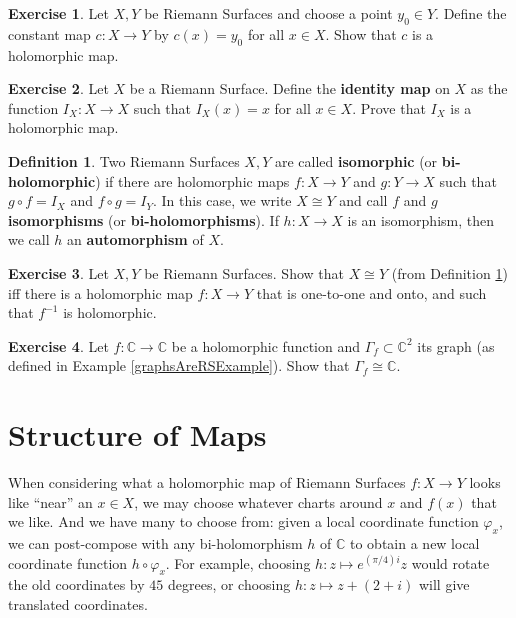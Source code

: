 \documentclass[12pt]{book}%
\theoremstyle{plain}
\theoremstyle{definition}
\newtheorem{definition}[theorem]{Definition}
\newtheorem{exercise}{Exercise}
\theoremstyle{remark}
\def\to{\rightarrow}
\def\bC{{\mathbb{C}}}
\begin{document}
\begin{exercise}
Let $X,Y$ be Riemann Surfaces and choose a point $y_0\in Y$. Define the constant map $c:X \to Y$ by $c(x) = y_0$ for all $x \in X$. Show that $c$ is a holomorphic map.
\end{exercise}


\begin{exercise}
Let $X$ be a Riemann Surface. Define the \textbf{identity map} on $X$ as the function $I_X:X \to X$ such that $I_X(x)=x$ for all $x\in X$. Prove that $I_X$ is a holomorphic map.
\end{exercise}


\begin{definition}
\label{isomorphicRS}
Two Riemann Surfaces $X,Y$ are called \textbf{isomorphic} (or \textbf{bi-holomorphic}) if there are holomorphic maps $f:X \to Y$ and $g:Y \to X$ such that $g \circ f = I_X$ and $f \circ g = I_Y$. In this case, we write $X \cong Y$ and call $f$ and $g$ \textbf{isomorphisms} (or\textbf{ bi-holomorphisms}). If $h:X \to X$ is an isomorphism, then we call $h$ an \textbf{automorphism} of $X$.
\end{definition}

\begin{exercise}
Let $X,Y$ be Riemann Surfaces. Show that $X \cong Y$ (from Definition \ref{isomorphicRS}) iff there is a holomorphic map $f:X \to Y$ that is one-to-one and onto, and such that $f^{-1}$ is holomorphic.
\end{exercise}

\begin{exercise}
Let $f:\bC \to \bC$ be a holomorphic function and $\Gamma_f \subset \bC^2$ its graph (as defined in Example \ref{graphsAreRSExample}). Show that $\Gamma_f \cong \bC$.
\end{exercise}

\section{Structure of Maps}

When considering what a holomorphic map of Riemann Surfaces $f:X \to Y$ looks like ``near'' an $x \in X$, we may choose whatever charts around $x$ and $f(x)$ that we like. And we have many to choose from: given a local coordinate function $\varphi_x$, we can post-compose with any bi-holomorphism $h$ of $\bC$ to obtain a new local coordinate function $h \circ \varphi_x$. For example, choosing $h:z \mapsto e^{(\pi/4)i}z$ would rotate the old coordinates by $45$ degrees, or choosing $h: z \mapsto z+(2+i)$ will give translated coordinates.
\end{document}
